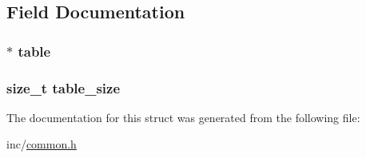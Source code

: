 \subsection{Field Documentation}
\hypertarget{structhtable__t_a25616ff5782226d344be7754fdb31a79}{
\subsubsection[{table}]{$\ast$ table}}\label{structhtable__t_a25616ff5782226d344be7754fdb31a79}
\hypertarget{structhtable__t_a4b1e1710466cc61c28bae3d4b6e9c063}{
\subsubsection[{table\-\_\-size}]{\setlength{\rightskip}{0pt plus 5cm}size\-\_\-t table\-\_\-size}}\label{structhtable__t_a4b1e1710466cc61c28bae3d4b6e9c063}


The documentation for this struct was generated from the following file\-:\begin{DoxyCompactItemize}
\item 
inc/\hyperlink{common_8h}{common.\-h}\end{DoxyCompactItemize}

